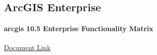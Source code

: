 
\subsection{ArcGIS Enterprise}
\paragraph{arcgis 10.5 Enterprise Functionality Matrix}
\href{../../documentation/readingRoom/ESRiResources/arcgis10.5EnterpriseFunctionalityMatrix.pdf}{Document Link}

